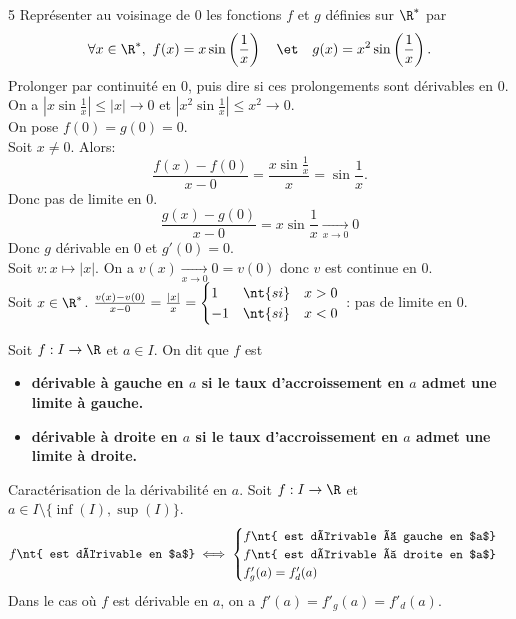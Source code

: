 \documentclass[11pt]{article}
\begin{document}
\begin{ex}{}{5}
    Représenter au voisinage de 0 les fonctions $f$ et $g$ définies sur $\R^*$ par
    \begin{equation*}
        \forall x \in \R^*, ~ f(x)=x\sin\left( \frac{1}{x} \right) \quad\et\quad g(x)=x^2\sin\left( \frac{1}{x} \right).
    \end{equation*}
    Prolonger par continuité en 0, puis dire si ces prolongements sont dérivables en 0.
    \tcblower
    On a $|x\sin\frac{1}{x}|\leq|x|\to0$ et $|x^2\sin\frac{1}{x}|\leq x^2\to0$.\\
    On pose $f(0)=g(0)=0$.\\
    Soit $x\neq0$. Alors:
    \begin{equation*}
        \frac{f(x)-f(0)}{x-0}=\frac{x\sin\frac{1}{x}}{x}=\sin\frac{1}{x}.
    \end{equation*}
    Donc pas de limite en 0.
    \begin{equation*}
        \frac{g(x)-g(0)}{x-0}=x\sin\frac{1}{x}\xrightarrow[x\to0]{}0
    \end{equation*}
    Donc $g$ dérivable en 0 et $g'(0)=0$.\\
    Soit $v:x\mapsto|x|.$ On a $v(x)\xrightarrow[x\to0]{}0=v(0)$ donc $v$ est continue en 0.\\
    Soit $x\in\R^*$. $\frac{v(x)-v(0)}{x-0}=\frac{|x|}{x}=\begin{cases}
        1&\nt{si}\quad x>0\\
        -1&\nt{si}\quad x<0
    \end{cases}$ : pas de limite en 0.
\end{ex}

\vspace*{0.4cm}

\begin{defi}{}{}
    Soit $f:I\to\R$ et $a\in I$. On dit que $f$ est
    \begin{itemize}
        \item \bf{dérivable à gauche} en $a$ si le taux d'accroissement en $a$ admet une limite à gauche.
        \item \bf{dérivable à droite} en $a$ si le taux d'accroissement en $a$ admet une limite à droite.
    \end{itemize}
\end{defi}

\vspace*{0.4cm}

\begin{prop}{Caractérisation de la dérivabilité en $a$.}{}
    Soit $f:I\to\R$ et $a\in I\setminus\{\inf(I),\sup(I)\}$.
    \begin{equation*}
        f \nt{ est dérivable en $a$} \iff \begin{cases}
            f \nt{ est dérivable à gauche en $a$}\\
            f \nt{ est dérivable à droite en $a$}\\
            f'_g(a)=f'_d(a)
        \end{cases}
    \end{equation*}
    Dans le cas où $f$ est dérivable en $a$, on a $f'(a)=f'_g(a)=f'_d(a)$.
\end{prop}
\end{document}
